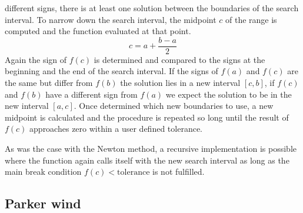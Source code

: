 \documentclass{aa}
\begin{document}
different signs, there is at least one solution between the boundaries of the
search interval. To narrow down the search interval, the midpoint \(c\) of the range
is computed and the function evaluated at that point.
\begin{equation}
    c = a + \frac{b - a}{2}
\end{equation}
Again the sign of \(f(c)\) is determined and compared to the signs at the
beginning and the end of the search interval. If the signs of \(f(a)\) and
\(f(c)\) are the same but differ from \(f(b)\) the solution lies in a new
interval \([c, b]\), if \(f(c)\) and \(f(b)\) have a different sign from
\(f(a)\) we expect the solution to be in the new interval \([a, c]\). Once
determined which new boundaries to use, a new midpoint is calculated and the
procedure is repeated so long until the result of \(f(c)\) approaches zero 
within a user defined tolerance.

As was the case with the Newton method, a recursive implementation is possible
where the function again calls itself with the new search interval as long as
the main break condition \(f(c) < \mathrm{tolerance}\) is not fulfilled.

\subsection{Parker wind}%
\label{ssub:parker_wind}
\end{document}
